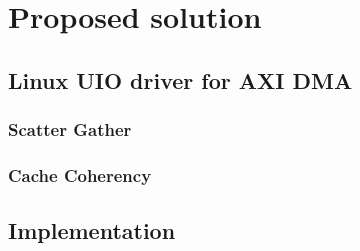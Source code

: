 
\chapter{Proposed solution }
\label{cha:proposed solution }



\section{Linux UIO driver for AXI DMA}
\label{sec:Linux UIO driver for AXI DMA}

\subsection{Scatter Gather}
\label{subsec:Scatter Gather}

\subsection{Cache Coherency}
\label{subsec:Cache Coherency}


\section{Implementation}
\label{sec:Implementation}




